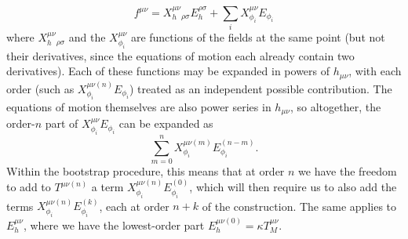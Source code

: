 \documentclass[aps,physrev,preprint,groupedaddress]{revtex4-2}
\begin{document}

\begin{equation}
f^{\mu\nu}=X_h^{\mu\nu}{}_{\rho\sigma}E_h^{\rho\sigma}+\sum_iX_{\phi_i}^{\mu\nu}E_{\phi_i}
\end{equation}
where \(X_h^{\mu\nu}{}_{\rho\sigma}\) and the \(X_{\phi_i}^{\mu\nu}\) are functions of the fields at the same point (but not their derivatives, since the equations of motion each already contain two derivatives). Each of these functions may be expanded in powers of \(h_{\mu\nu}\), with each order (such as \(X_{\phi_i}^{\mu\nu(n)}E_{\phi_i}\)) treated as an independent possible contribution. The equations of motion themselves are also power series in  \(h_{\mu\nu}\), so altogether, the order-\(n\) part of \(X_{\phi_i}^{\mu\nu}E_{\phi_i}\) can be expanded as 
\begin{equation}
\sum_{m=0}^nX_{\phi_i}^{\mu\nu(m)}E_{\phi_i}^{(n-m)} .
\end{equation}
Within the bootstrap procedure, this means that at order \(n\) we have the freedom to add to \(T^{\mu\nu(n)}\) a term \(X_{\phi_i}^{\mu\nu(n)}E_{\phi_i}^{(0)}\), which will then require us to also add the terms \(X_{\phi_i}^{\mu\nu(n)}E_{\phi_i}^{(k)}\), each at order \(n+k\) of the construction. The same applies to \(E_h^{\mu\nu}\), where we have the lowest-order part \(E_h^{\mu\nu(0)}=\kappa T_M^{\mu\nu}\).
\end{document}
